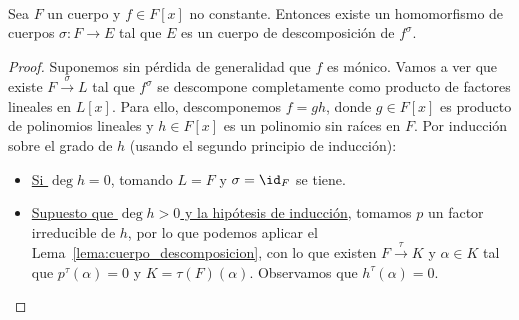\begin{prop}\label{prop:existe_cdd}~\\
    Sea $F$ un cuerpo y $f\in F[x]$ no constante. Entonces existe un homomorfismo de cuerpos $\sigma:F\to E$ tal que $E$ es un cuerpo de descomposición de $f^{\sigma}$.
    \begin{proof}
        Suponemos sin pérdida de generalidad que $f$ es mónico. Vamos a ver que existe $F\stackrel{\sigma}{\to}L$ tal que $f^\sigma$ se descompone completamente como producto de factores lineales en $L[x]$. Para ello, descomponemos $f=gh$, donde $g\in F[x]$ es producto de polinomios lineales y $h\in F[x]$ es un polinomio sin raíces en $F$. Por inducción sobre el grado de $h$ (usando el segundo principio de inducción):
        \begin{itemize}
            \item \underline{Si $\deg h = 0$}, tomando $L = F$ y $\sigma = \id_F$ se tiene.
            \item \underline{Supuesto que $\deg h>0$ y la hipótesis de inducción}, tomamos $p$ un factor irreducible de $h$, por lo que podemos aplicar el Lema~\ref{lema:cuerpo_descomposicion}, con lo que existen $F\stackrel{\tau}{\to}K$ y $\alpha\in K$ tal que $p^\tau(\alpha)=0$ y $K = \tau(F)(\alpha)$. Observamos que $h^\tau(\alpha)=0$.


\end{itemize}
\end{proof}
\end{prop}
